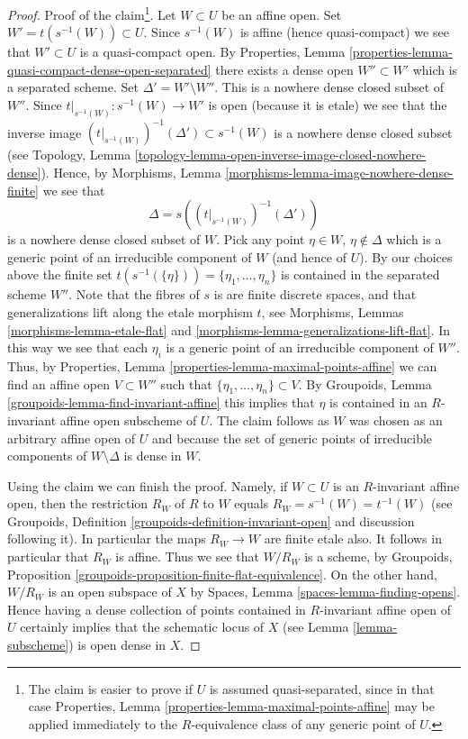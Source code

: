 \begin{proof}
\medskip\noindent
Proof of the claim\footnote{The claim is easier to prove if
$U$ is assumed quasi-separated, since in that case
Properties, Lemma \ref{properties-lemma-maximal-points-affine}
may be applied immediately to the $R$-equivalence class of any
generic point of $U$.}. Let $W \subset U$ be an affine open.
Set $W' = t(s^{-1}(W)) \subset U$. Since $s^{-1}(W)$ is affine
(hence quasi-compact) we see that $W' \subset U$ is a quasi-compact open. By
Properties, Lemma \ref{properties-lemma-quasi-compact-dense-open-separated}
there exists a dense open $W'' \subset W'$ which is a separated scheme.
Set $\Delta' = W' \setminus W''$. This is a nowhere dense closed subset of
$W''$. Since $t|_{s^{-1}(W)} : s^{-1}(W) \to W'$ is open (because it is etale)
we see that the inverse image
$(t|_{s^{-1}(W)})^{-1}(\Delta') \subset s^{-1}(W)$
is a nowhere dense closed subset (see
Topology, Lemma \ref{topology-lemma-open-inverse-image-closed-nowhere-dense}).
Hence, by
Morphisms, Lemma \ref{morphisms-lemma-image-nowhere-dense-finite} 
we see that
$$
\Delta = s\left((t|_{s^{-1}(W)})^{-1}(\Delta')\right)
$$
is a nowhere dense closed subset of $W$. Pick any point $\eta \in W$,
$\eta \not \in \Delta$ which is a generic point of an irreducible
component of $W$ (and hence of $U$). By our choices above the finite set
$t(s^{-1}(\{\eta\})) = \{\eta_1, \ldots, \eta_n\}$
is contained in the separated scheme $W''$.
Note that the fibres of $s$ is are finite discrete spaces, and that
generalizations lift along the etale morphism $t$, see
Morphisms, Lemmas \ref{morphisms-lemma-etale-flat}
and \ref{morphisms-lemma-generalizations-lift-flat}.
In this way we see that each $\eta_i$ is a generic point of an
irreducible component of $W''$. Thus, by
Properties, Lemma \ref{properties-lemma-maximal-points-affine}
we can find an affine open $V \subset W''$ such that
$\{\eta_1, \ldots, \eta_n\} \subset V$.
By
Groupoids, Lemma \ref{groupoids-lemma-find-invariant-affine}
this implies that $\eta$ is contained in an $R$-invariant affine
open subscheme of $U$. The claim follows as $W$ was chosen as an
arbitrary affine open of $U$ and because the set of generic points
of irreducible components of $W \setminus \Delta$ is dense in $W$.

\medskip\noindent
Using the claim we can finish the proof. Namely, if $W \subset U$ is
an $R$-invariant affine open, then the restriction $R_W$ of $R$ to $W$
equals $R_W = s^{-1}(W) = t^{-1}(W)$ (see
Groupoids, Definition \ref{groupoids-definition-invariant-open}
and discussion following it). In particular the maps $R_W \to W$ are
finite etale also. It follows in particular that $R_W$ is affine.
Thus we see that $W/R_W$ is a scheme, by
Groupoids, Proposition \ref{groupoids-proposition-finite-flat-equivalence}.
On the other hand, $W/R_W$ is an open subspace of $X$ by
Spaces, Lemma \ref{spaces-lemma-finding-opens}.
Hence having a dense collection of points contained in $R$-invariant
affine open of $U$ certainly implies that the schematic locus of $X$
(see Lemma \ref{lemma-subscheme})
is open dense in $X$.
\end{proof}











